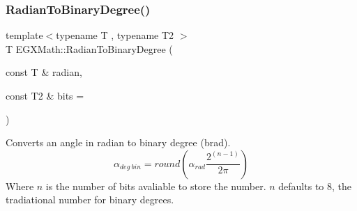 \subsubsection{\texorpdfstring{Radian\+To\+Binary\+Degree()}{RadianToBinaryDegree()}}
{\footnotesize\ttfamily template$<$typename T , typename T2 $>$ \\
T E\+G\+X\+Math\+::\+Radian\+To\+Binary\+Degree (\begin{DoxyParamCaption}\item[{const T \&}]{radian,  }\item[{const T2 \&}]{bits = {} }\end{DoxyParamCaption})}



Converts an angle in radian to binary degree (brad). \[\alpha_{deg\ bin}=round(\alpha_{rad}\frac{2^{(n-1)}}{2 \pi})\] Where $n$ is the number of bits avaliable to store the number. $n$ defaults to 8, the tradiational number for binary degrees. 

